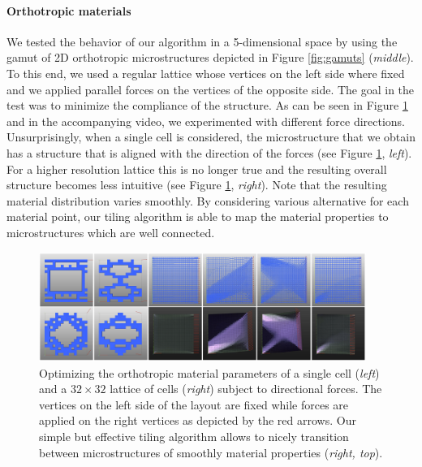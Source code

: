 \paragraph{Orthotropic materials}
We tested the behavior of our algorithm in a 5-dimensional space by using the gamut of 2D orthotropic microstructures depicted in Figure \ref{fig:gamuts} (\emph{middle}). To this end, we used a regular lattice whose vertices on the left side where fixed and we applied parallel forces on the vertices of the opposite side. The goal in the test was to minimize the compliance of the structure. As can be seen in Figure \ref{plot:res} and in the accompanying video, we experimented with different force directions. Unsurprisingly, when a single cell is considered, the microstructure that we obtain has a structure that is aligned with the direction of the forces (see Figure \ref{plot:res}, \emph{left}). 
For a higher resolution lattice this is no longer true and the resulting overall structure becomes less intuitive (see Figure \ref{plot:res}, \emph{right}). 
Note that the resulting material distribution varies smoothly. By considering various alternative for each material point, our tiling algorithm is able to map the material properties to microstructures which are well connected. 

\begin{figure}
	\centering
	\includegraphics[width=0.95\textwidth]{images/ortho_square.png}
	\caption{Optimizing the orthotropic material parameters of a single cell (\emph{left}) and a $32\times32$ lattice of cells (\emph{right}) subject to directional forces. The vertices on the left side of the layout are fixed while forces are applied on the right vertices as depicted by the red arrows. Our simple but effective tiling algorithm allows to nicely transition between microstructures of smoothly material properties (\emph{right, top}).}
	\label{plot:res}
\end{figure}

